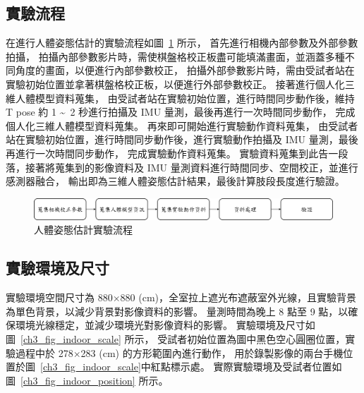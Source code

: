 \subsection{實驗流程}
在進行人體姿態估計的實驗流程如圖~\ref{ch3_fig_exp_flow} 所示，
首先進行相機內部參數及外部參數拍攝，
拍攝內部參數影片時，需使棋盤格校正板盡可能填滿畫面，並涵蓋多種不同角度的畫面，以便進行內部參數校正，
拍攝外部參數影片時，需由受試者站在實驗初始位置並拿著棋盤格校正板，以便進行外部參數校正。
接著進行個人化三維人體模型資料蒐集，
由受試者站在實驗初始位置，進行時間同步動作後，維持 T pose 約 1 \textasciitilde\ 2 秒進行拍攝及 IMU 量測，最後再進行一次時間同步動作，
完成個人化三維人體模型資料蒐集。
再來即可開始進行實驗動作資料蒐集，
由受試者站在實驗初始位置，進行時間同步動作後，進行實驗動作拍攝及 IMU 量測，最後再進行一次時間同步動作，
完成實驗動作資料蒐集。
實驗資料蒐集到此告一段落，接著將蒐集到的影像資料及 IMU 量測資料進行時間同步、空間校正，並進行感測器融合，
輸出即為三維人體姿態估計結果，最後計算肢段長度進行驗證。

\begin{figure}[!ht]
   \centering
   \includegraphics[width=\linewidth]{figure/ch3_fig_exp_flow.png}
    \caption[人體姿態估計實驗流程]{人體姿態估計實驗流程}
    \label{ch3_fig_exp_flow}
\end{figure}


\subsection{實驗環境及尺寸}
實驗環境空間尺寸為 880$\times$880 (cm)，全室拉上遮光布遮蔽室外光線，且實驗背景為單色背景，以減少背景對影像資料的影響。
量測時間為晚上 8 點至 9 點，以確保環境光線穩定，並減少環境光對影像資料的影響。
實驗環境及尺寸如圖~\ref{ch3_fig_indoor_scale} 所示，
受試者初始位置為圖中黑色空心圓圈位置，實驗過程中於 278$\times$283 (cm) 的方形範圍內進行動作，
用於錄製影像的兩台手機位置於圖~\ref{ch3_fig_indoor_scale}中紅點標示處。
實際實驗環境及受試者位置如圖~\ref{ch3_fig_indoor_position} 所示。

